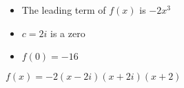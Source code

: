 {\begin{itemize}

\item The leading term of $f(x)$ is $-2x^3$
\item $c=2i$ is a zero
\item $f(0) = -16$

\end{itemize}}
{$f(x) = -2(x-2i)(x+2i)(x+2)$}